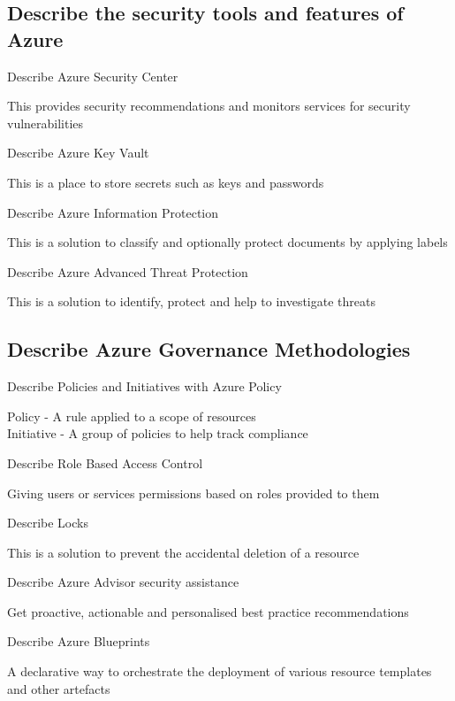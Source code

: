 \documentclass[addpoints]{exam}
\begin{document}
\begin{questions}
\subsection{Describe the security tools and features of Azure}
\question Describe Azure Security Center
\begin{solution}[2in]
	This provides security recommendations and monitors services for security vulnerabilities
\end{solution}
\question Describe Azure Key Vault
\begin{solution}[2in]
	This is a place to store secrets such as keys and passwords
\end{solution}
\question Describe Azure Information Protection
\begin{solution}[2in]
	This is a solution to classify and optionally protect documents by applying labels
\end{solution}
\question Describe Azure Advanced Threat Protection
\begin{solution}[2in]
	This is a solution to identify, protect and help to investigate threats
\end{solution}
\subsection{Describe Azure Governance Methodologies}
\question Describe Policies and Initiatives with Azure Policy
\begin{solution}[2in]
	Policy - A rule applied to a scope of resources\\
	Initiative - A group of policies to help track compliance
\end{solution}
\question Describe Role Based Access Control
\begin{solution}[2in]
	Giving users or services permissions based on roles provided to them
\end{solution}
\question Describe Locks
\begin{solution}[2in]
	This is a solution to prevent the accidental deletion of a resource
\end{solution}
\question Describe Azure Advisor security assistance
\begin{solution}[2in]
	Get proactive, actionable and personalised best practice recommendations
\end{solution}
\question Describe Azure Blueprints
\begin{solution}[2in]
	A declarative way to orchestrate the deployment of various resource templates and other artefacts
\end{solution}

\end{questions}
\end{document}

